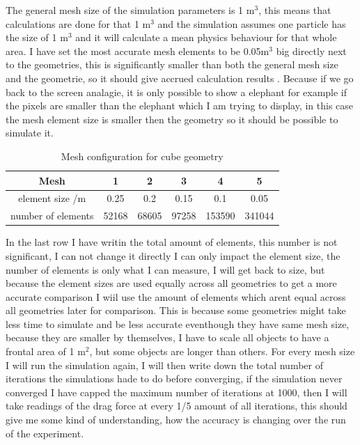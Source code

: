 \documentclass[12pt,a4paper]{article}
\begin{document}
The general mesh size of the simulation parameters is 1 m$^3$, this means that calculations are done for that 1 m$^3$ and the simulation assumes one particle has the size of 1 m$^3$ and it will calculate a mean physics behaviour for that whole area. I have set the most accurate mesh elements to be 0.05m$^3$ big directly next to the geometries, this is significantly smaller than both the general mesh size and the geometrie, so it should give accrued calculation results \cite{blazek2015computational}. Because if we go back to the screen analagie, it is only possible to show a elephant for example if the pixels are smaller than the elephant which I am trying to display, in this case the mesh element size is smaller then the geometry so it should be possible to simulate it.

\begin{table}[H]
\centering
\caption{Mesh configuration for cube geometry}
\label{tab:mesh_config}
\begin{tabular}{|c|c|c|c|c|c|}
\hline
\rowcolor{red!50}
\textbf{Mesh} & \textbf{1} & \textbf{2} & \textbf{3} & \textbf{4} & \textbf{5} \\
\hline
element size /m & 0.25 & 0.2 & 0.15 & 0.1 & 0.05 \\
\hline
number of elements & 52168 & 68605 & 97258 & 153590 & 341044 \\
\hline
\end{tabular}
\end{table}

In the last row I have writin the total amount of elements, this number is not significant, I can not change it directly I can only impact the element size, the number of elements is only what I can measure, I will get back to size, but because the element sizes are used equally across all geometries to get a more accurate comparison I wiil use the amount of elements which arent equal across all geometries later for comparison. This is because some geometries might take less time to simulate and be less accurate eventhough they have same mesh size, because they are smaller by themselves, I have to scale all objects to have a frontal area of 1 m$^2$, but some objects are longer than others. For every mesh size I will run the simulation again, I will then write down the total number of iterations the simulations hade to do before converging, if the simulation never converged I have capped the maximum number of iterations at 1000, then I will take readings of the drag force at every 1/5 amount of all iterations, this should give me some kind of understanding, how the accuracy is changing over the run of the experiment.
\end{document}
